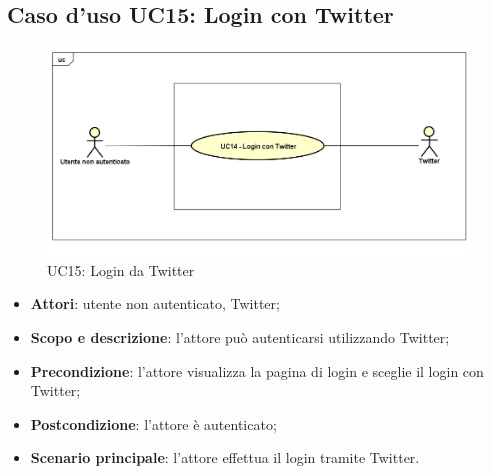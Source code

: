 \newpage
\subsection{Caso d'uso UC15: Login con Twitter}
\label{UC15}
\begin{figure}
	\centering
	\includegraphics[scale=0.48]{UML/UC15.png}
	\caption{UC15: Login da Twitter}
\end{figure}
\FloatBarrier
\begin{itemize}
	\item \textbf{Attori}: utente non autenticato, Twitter;
	\item \textbf{Scopo e descrizione}: l'attore può autenticarsi utilizzando Twitter;
	\item \textbf{Precondizione}: l'attore visualizza la pagina di login e sceglie il login con Twitter;
	\item \textbf{Postcondizione}: l'attore è autenticato;
	\item \textbf{Scenario principale}: l'attore effettua il login tramite Twitter.
\end{itemize}
